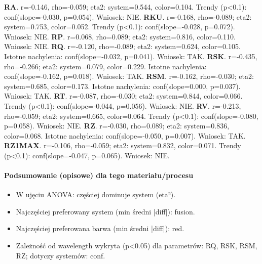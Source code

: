 \documentclass[
  10pt,
]{article}
\begin{document}
\textbf{RA}. r=-0.146, rho=-0.059; eta2: system=0.544, color=0.104.
Trendy (p\textless0.1): conf(slope=-0.030, p=0.054). Wniosek: NIE.
\textbf{RKU}. r=-0.168, rho=-0.089; eta2: system=0.753, color=0.052.
Trendy (p\textless0.1): conf(slope=-0.028, p=0.072). Wniosek: NIE.
\textbf{RP}. r=0.068, rho=0.089; eta2: system=0.816, color=0.110.
Wniosek: NIE. \textbf{RQ}. r=-0.120, rho=-0.089; eta2: system=0.624,
color=0.105. Istotne nachylenia: conf(slope=-0.032, p=0.041). Wniosek:
TAK. \textbf{RSK}. r=-0.435, rho=-0.266; eta2: system=0.079,
color=0.229. Istotne nachylenia: conf(slope=-0.162, p=0.018). Wniosek:
TAK. \textbf{RSM}. r=-0.162, rho=-0.030; eta2: system=0.685,
color=0.173. Istotne nachylenia: conf(slope=0.000, p=0.037). Wniosek:
TAK. \textbf{RT}. r=-0.087, rho=-0.030; eta2: system=0.844, color=0.066.
Trendy (p\textless0.1): conf(slope=-0.044, p=0.056). Wniosek: NIE.
\textbf{RV}. r=-0.213, rho=-0.059; eta2: system=0.665, color=0.064.
Trendy (p\textless0.1): conf(slope=-0.080, p=0.058). Wniosek: NIE.
\textbf{RZ}. r=-0.030, rho=0.089; eta2: system=0.836, color=0.068.
Istotne nachylenia: conf(slope=-0.050, p=0.007). Wniosek: TAK.
\textbf{RZ1MAX}. r=-0.106, rho=-0.059; eta2: system=0.832, color=0.071.
Trendy (p\textless0.1): conf(slope=-0.047, p=0.065). Wniosek: NIE.

\paragraph{Podsumowanie (opisowe) dla tego materiału/procesu}
\begin{itemize}
\item W ujęciu ANOVA: częściej dominuje system (eta²).
\item Najczęściej preferowany system (min średni |diff|): fusion.
\item Najczęściej preferowana barwa (min średni |diff|): red.
\item Zależność od wavelength wykryta (p<0.05) dla parametrów: RQ, RSK, RSM, RZ; dotyczy systemów: conf.
\end{itemize}
\end{document}
